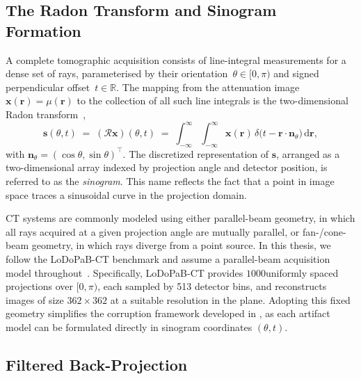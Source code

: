 \subsection{The Radon Transform and Sinogram Formation}
\label{subsec:bg_radon}

A complete tomographic acquisition consists of line-integral measurements for a dense set of rays, parameterised by their orientation~$\theta \in [0,\pi)$ and signed
perpendicular offset~$t \in \mathbb{R}$. The mapping from the attenuation image $\boldsymbol{x}(\boldsymbol{r}) = \mu(\boldsymbol{r})$ to the collection of all such line
integrals is the two-dimensional Radon transform~\cite{Radon1917, KakSlaney1988},
\begin{equation}
    \boldsymbol{s}(\theta, t) \;=\; (\mathcal{R}\boldsymbol{x})(\theta, t)
    \;=\; \int_{-\infty}^{\infty}\!\!\int_{-\infty}^{\infty} \boldsymbol{x}(\boldsymbol{r})\,
        \delta\bigl(t - \boldsymbol{r}\!\cdot\!\boldsymbol{n}_{\theta}\bigr)\,\mathrm{d}\boldsymbol{r},
    \label{eq:radon}
\end{equation}
with $\boldsymbol{n}_{\theta} = (\cos\theta, \sin\theta)^{\!\top}$. The discretized representation of $\boldsymbol{s}$, arranged as a two-dimensional array indexed by projection angle and detector position, is referred to as the \emph{sinogram}. This name reflects the fact that a point in image space traces a sinusoidal curve in the projection domain.

CT systems are commonly modeled using either parallel-beam geometry, in which all rays acquired at a given projection angle are mutually parallel, or fan-/cone-beam geometry, in which rays diverge from a point source. In this thesis, we follow the LoDoPaB-CT benchmark and assume a parallel-beam acquisition model throughout~\cite{Leuschner2021}. Specifically, LoDoPaB-CT provides $1000$uniformly spaced projections over $[0,\pi)$, each sampled by 513 detector bins, and reconstructs images of size $362\times362$ at a suitable resolution in the plane. Adopting this fixed geometry simplifies the corruption framework developed in , as each artifact model can be formulated directly in sinogram coordinates $(\theta, t)$.

\subsection{Filtered Back-Projection}
\label{subsec:bg_fbp}

